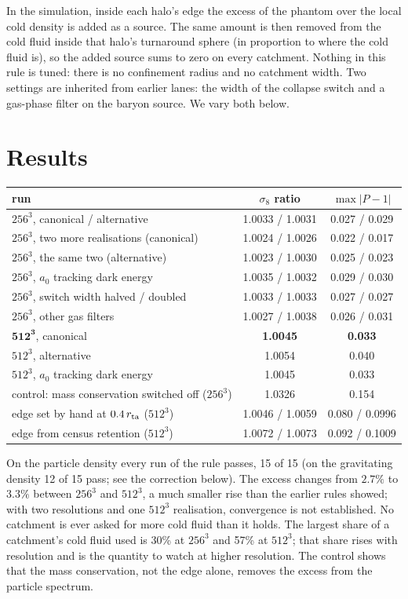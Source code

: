 \documentclass[10pt]{article}
\begin{document}
In the simulation, inside each halo's edge the excess of the phantom over the local cold density is added as a source. The same amount is then removed from the cold fluid inside that halo's turnaround sphere (in proportion to where the cold fluid is), so the added source sums to zero on every catchment. Nothing in this rule is tuned: there is no confinement radius and no catchment width. Two settings are inherited from earlier lanes: the width of the collapse switch and a gas-phase filter on the baryon source. We vary both below.

\section{Results}
\begin{center}
\begin{tabular}{lcc}
\toprule
run & $\sigma_8$ ratio & $\max|P-1|$\\
\midrule
$256^3$, canonical / alternative & 1.0033 / 1.0031 & 0.027 / 0.029\\
$256^3$, two more realisations (canonical) & 1.0024 / 1.0026 & 0.022 / 0.017\\
$256^3$, the same two (alternative) & 1.0023 / 1.0030 & 0.025 / 0.023\\
$256^3$, $a_0$ tracking dark energy & 1.0035 / 1.0032 & 0.029 / 0.030\\
$256^3$, switch width halved / doubled & 1.0033 / 1.0033 & 0.027 / 0.027\\
$256^3$, other gas filters & 1.0027 / 1.0038 & 0.026 / 0.031\\
$\mathbf{512^3}$, canonical & \textbf{1.0045} & \textbf{0.033}\\
$512^3$, alternative & 1.0054 & 0.040\\
$512^3$, $a_0$ tracking dark energy & 1.0045 & 0.033\\
\midrule
control: mass conservation switched off ($256^3$) & 1.0326 & 0.154\\
edge set by hand at $0.4\,r_{\rm ta}$ ($512^3$) & 1.0046 / 1.0059 & 0.080 / 0.0996\\
edge from census retention ($512^3$) & 1.0072 / 1.0073 & 0.092 / 0.1009\\
\bottomrule
\end{tabular}
\end{center}
On the particle density every run of the rule passes, 15 of 15 (on the gravitating density 12 of 15 pass; see the correction below). The excess changes from $2.7\%$ to $3.3\%$ between $256^3$ and $512^3$, a much smaller rise than the earlier rules showed; with two resolutions and one $512^3$ realisation, convergence is not established. No catchment is ever asked for more cold fluid than it holds. The largest share of a catchment's cold fluid used is 30\% at $256^3$ and 57\% at $512^3$; that share rises with resolution and is the quantity to watch at higher resolution. The control shows that the mass conservation, not the edge alone, removes the excess from the particle spectrum.
\end{document}

